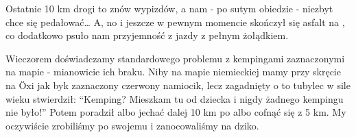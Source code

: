 Ostatnie 10 km drogi to znów wypizdów, a nam - po sutym obiedzie - niezbyt chce się pedałować… A, no i jeszcze w pewnym momencie skończył się asfalt na , co dodatkowo psuło nam przyjemność z jazdy z pełnym żołądkiem.


Wieczorem doświadczamy standardowego problemu z kempingami zaznaczonymi na mapie - mianowicie ich braku. Niby na mapie niemieckiej mamy przy skręcie na Öxi jak byk zaznaczony czerwony namiocik, lecz zagadnięty o to tubylec w sile wieku stwierdził: “Kemping? Mieszkam tu od dziecka i nigdy żadnego kempingu nie było!” Potem poradził albo jechać dalej 10 km po  albo cofnąć się z 5 km. My oczywiście zrobiliśmy po swojemu i zanocowaliśmy na dziko.